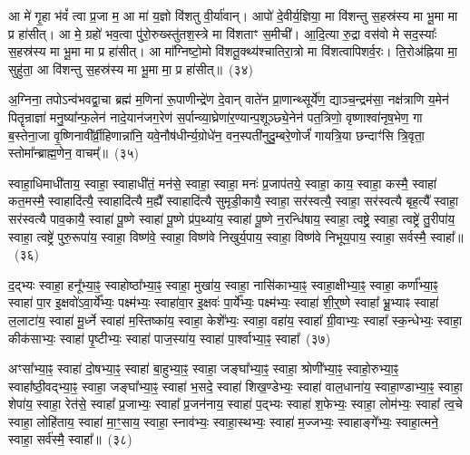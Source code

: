 {\anuvakamend[{भुव॑श्च॒त्वारि॑ च}]}%

आ मे॑ गृ॒हा भ॑वं᳚ त्वा प्र॒जा म॒ आ मा॑ य॒ज्ञो वि॑शतु वी॒र्या॑वान्। आपो॑ दे॒वीर्य॒ज्ञिया॒ मा वि॑शन्तु स॒हस्र॑स्य मा भू॒मा मा प्र हा॑सीत्। आ मे॒ ग्रहो॑ भव॒त्वा पु॑रो॒रुख्स्तु॑तश॒स्त्रे मा वि॑शताꣳ स॒मीची᳚। आ॒दि॒त्या रु॒द्रा वस॑वो मे सद॒स्याः᳚ स॒हस्र॑स्य मा भू॒मा मा प्र हा॑सीत्। आ मा᳚ग्निष्टो॒मो वि॑शतू॒क्थ्य॑श्चातिरा॒त्रो मा वि॑शत्वापिशर्व॒रः। ति॒रोअ॑ह्निया मा॒ सुहु॑ता॒ आ वि॑शन्तु स॒हस्र॑स्य मा भू॒मा मा॒ प्र हा॑सीत्॥~(३४)

{\anuvakamend[{अ॒ग्नि॒ष्टो॒मो वि॑शत्व॒ष्टाद॑श च}]}%

अ॒ग्निना॒ तपो\-ऽन्व॑भवद्वा॒चा ब्रह्म॑ म॒णिना॑ रू॒पाणीन्द्रे॑ण दे॒वान् वाते॑न प्रा॒णान्थ्सूर्ये॑ण॒ द्याञ्च॒न्द्रम॑सा॒ नक्ष॑त्राणि य॒मेन॑ पितॄन्राज्ञा॑ मनु॒ष्या᳚न्फ॒लेन॑ नादे॒यान॑जग॒रेण॑ स॒र्पान्व्या॒घ्रेणा॑र॒ण्यान्प॒शूञ्छ्ये॒नेन॑ पत॒त्रिणो॒ वृष्णाश्वा॑नृष॒भेण॒ गा ब॒स्तेना॒जा वृ॒ष्णिनावी᳚र्व्री॒हिणान्ना॑नि॒ यवे॒नौष॑धीर्न्य॒ग्रोधे॑न॒ वन॒स्पती॑नुदु॒म्बरे॒णोर्जं॑ गायत्रि॒या छन्दाꣳ॑सि त्रि॒वृता॒ स्तोमा᳚न्ब्राह्म॒णेन॒ वाचम्᳚॥~(३५)

{\anuvakamend[{ब्रा॒ह्म॒णेनैक॑ञ्च}]}%

स्वाहा॒धिमाधी॑ताय॒ स्वाहा॒ स्वाहाधी॑तं॒ मन॑से॒ स्वाहा॒ स्वाहा॒ मनः॑ प्र॒जा\-प॑तये॒ स्वाहा॒ काय॒ स्वाहा॒ कस्मै॒ स्वाहा॑ कत॒मस्मै॒ स्वाहादि॑त्यै॒ स्वाहादि॑त्यै म॒ह्यै᳚ स्वाहादि॑त्यै सुमृडी॒कायै॒ स्वाहा॒ सर॑स्वत्यै॒ स्वाहा॒ सर॑स्वत्यै बृह॒त्यै᳚ स्वाहा॒ सर॑स्वत्यै पाव॒कायै॒ स्वाहा॑ पू॒ष्णे स्वाहा॑ पू॒ष्णे प्र॑प॒थ्या॑य॒ स्वाहा॑ पू॒ष्णे न॒रन्धि॑षाय॒ स्वाहा॒ त्वष्ट्रे॒ स्वाहा॒ त्वष्ट्रे॑ तु॒रीपा॑य॒ स्वाहा॒ त्वष्ट्रे॑ पुरु॒रूपा॑य॒ स्वाहा॒ विष्ण॑वे॒ स्वाहा॒ विष्ण॑वे निखुर्य॒पाय॒ स्वाहा॒ विष्ण॑वे निभूय॒पाय॒ स्वाहा॒ सर्वस्मै॒ स्वाहा᳚॥~(३६)

{\anuvakamend[{पु॒रु॒रूपा॑य॒ स्वाहा॒ दश॑ च}]}%

द॒द्भ्यः स्वाहा॒ हनू᳚भ्या॒ꣴ॒ स्वाहोष्ठा᳚भ्या॒ꣴ॒ स्वाहा॒ मुखा॑य॒ स्वाहा॒ नासि॑काभ्या॒ꣴ॒ स्वाहा॒क्षीभ्या॒ꣴ॒ स्वाहा॒ कर्णा᳚भ्या॒ꣴ॒ स्वाहा॑ पा॒र इ॒क्षवो॑\-ऽवा॒र्ये᳚भ्यः॒ पक्ष्म॑भ्यः॒ स्वाहा॑वा॒र इ॒क्षवः॑ पा॒र्ये᳚भ्यः॒ पक्ष्म॑भ्यः॒ स्वाहा॑ शी॒र्॒\mbox{}ष्णे स्वाहा᳚ भ्रू॒भ्याꣴ स्वाहा॑ ल॒लाटा॑य॒ स्वाहा॑ मू॒र्ध्ने स्वाहा॑ म॒स्तिष्का॑य॒ स्वाहा॒ केशे᳚भ्यः॒ स्वाहा॒ वहा॑य॒ स्वाहा᳚ ग्री॒वाभ्यः॒ स्वाहा᳚ स्क॒न्धेभ्यः॒ स्वाहा॒ कीक॑साभ्यः॒ स्वाहा॑ पृ॒ष्टीभ्यः॒ स्वाहा॑ पाज॒स्या॑य॒ स्वाहा॑ पा॒र्श्वाभ्या॒ꣴ॒ स्वाहा᳚~(३७)

अꣳसा᳚भ्या॒ꣴ॒ स्वाहा॑ दो॒षभ्या॒ꣴ॒ स्वाहा॑ बा॒हुभ्या॒ꣴ॒ स्वाहा॒ जङ्घा᳚भ्या॒ꣴ॒ स्वाहा॒ श्रोणी᳚भ्या॒ꣴ॒ स्वाहो॒रुभ्या॒ꣴ॒ स्वाहा᳚ष्ठी॒वद्भ्या॒ꣴ॒ स्वाहा॒ जङ्घा᳚भ्या॒ꣴ॒ स्वाहा॑ भ॒सदे॒ स्वाहा॑ शिख॒ण्डेभ्यः॒ स्वाहा॑ वाल॒धाना॑य॒ स्वाहा॒ण्डाभ्या॒ꣴ॒ स्वाहा॒ शेपा॑य॒ स्वाहा॒ रेत॑से॒ स्वाहा᳚ प्र॒जाभ्यः॒ स्वाहा᳚ प्र॒जन॑नाय॒ स्वाहा॑ प॒द्भ्यः स्वाहा॑ श॒फेभ्यः॒ स्वाहा॒ लोम॑भ्यः॒ स्वाहा᳚ त्व॒चे स्वाहा॒ लोहि॑ताय॒ स्वाहा॑ मा॒ꣳ॒साय॒ स्वाहा॒ स्नाव॑भ्यः॒ स्वाहा॒स्थभ्यः॒ स्वाहा॑ म॒ज्जभ्यः॒ स्वाहाङ्गे᳚भ्यः॒ स्वाहा॒त्मने॒ स्वाहा॒ सर्व॑स्मै॒ स्वाहा᳚॥~(३८)

